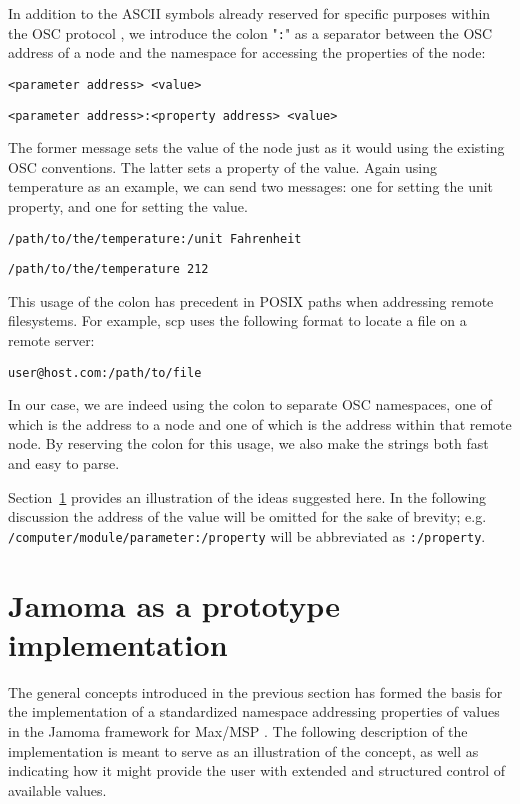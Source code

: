 \documentclass{sig-alternate}
\begin{document}
In addition to the ASCII symbols already reserved for specific purposes within the OSC protocol \cite{Wright:1997}, we introduce the colon "\texttt{:}" as a separator between the OSC address of a node and the namespace for accessing the properties of the node:

\texttt{<parameter address> <value>}

\texttt{<parameter address>:<property address> <value>}

The former message sets the value of the node just as it would using the existing OSC conventions. The latter sets a property of the value.  Again using temperature as an example, we can send two messages: one for setting the unit property, and one for setting the value.

\texttt{/path/to/the/temperature:/unit Fahrenheit}

\texttt{/path/to/the/temperature 212}

This usage of the colon has precedent in POSIX paths when addressing remote filesystems.  For example, scp uses the following format to locate a file on a remote server:

\texttt{user@host.com:/path/to/file}

In our case, we are indeed using the colon to separate OSC namespaces, one of which is the address to a node and one of which is the address within that remote node.  By reserving the colon for this usage, we also make the strings both fast and easy to parse.

Section~\ref{sec:prototype_implementation} provides an illustration of the ideas suggested here. In the following discussion the address of the value will be omitted for the sake of brevity; e.g.\\ 
\texttt{/computer/module/parameter:/property}  
will be abbreviated as \texttt{:/property}.







\section{Jamoma as a prototype implementation} %
\label{sec:prototype_implementation}

The general concepts introduced in the previous section has formed the basis for the implementation of a standardized namespace addressing properties of values in the Jamoma framework for Max/MSP \cite{Place:2006}. The following description of the implementation is meant to serve as an illustration of the concept, as well as indicating how it might provide the user with extended and structured control of available values.
\end{document}
